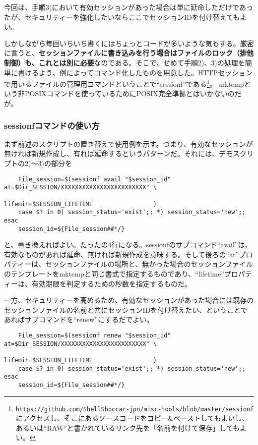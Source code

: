 今回は、手順3)において有効セッションがあった場合は単に延命しただけであったが、セキュリティーを強化したいならここでセッションIDを付け替えてもよい。

しかしながら毎回いちいち書くにはちょっとコードが多いような気もする。厳密に言うと、\textbf{セッションファイルに書き込みを行う場合はファイルのロック（排他制御）も、これとは別に必要}なのである。そこで、せめて手順2)、3)の処理を簡単に書けるよう、例によってコマンド化したものを用意した。HTTPセッションで用いるファイルの管理用コマンドということで``sessionf''である\footnote{\verb|https://github.com/ShellShoccar-jpn/misc-tools/blob/master/sessionf|にアクセスし、そこにあるソースコードをコピー\&{}ペーストしてもよいし、あるいは``RAW''と書かれているリンク先を「名前を付けて保存」してもよい。}。
mktempという非POSIXコマンドを使っているためにPOSIX完全準拠とはいかないのだが。

\subsubsection*{sessionfコマンドの使い方}

まず前述のスクリプトの置き替えで使用例を示す。つまり、有効なセッションが無ければ新規作成し、有れば延命するというパターンだ。それには、デモスクリプトの2)～3)の部分を \\
\begin{frameboxit}{160.0mm}
\begin{verbatim}
	File_session=$(sessionf avail "$session_id" at=$Dir_SESSION/XXXXXXXXXXXXXXXXXXXXXXXX" \
	                                            lifemin=$SESSION_LIFETIME                 )
	case $? in 0) session_status='exist';; *) session_status='new';; esac
	session_id=${File_session##*/}
\end{verbatim}
\end{frameboxit}
と、書き換えればよい。たったの4行になる。sessionfのサブコマンド``avail''は、有効なものがあれば延命、無ければ新規作成を意味する。そして後ろの``at''プロパティーは、セッションファイルの場所と、無かった場合のセッションファイルのテンプレートをmktempと同じ書式で指定するものであり、``lifetime''プロパティーは、有効期限を判定するための秒数を指定するものだ。

一方、セキュリティーを高めるため、有効なセッションがあった場合には既存のセッションファイルの名前と共にセッションIDを付け替えたい、ということであればサブコマンドを``renew''にするだでよい。\\
\begin{frameboxit}{160.0mm}
\begin{verbatim}
	File_session=$(sessionf renew "$session_id" at=$Dir_SESSION/XXXXXXXXXXXXXXXXXXXXXXXX" \
	                                            lifemin=$SESSION_LIFETIME                 )
	case $? in 0) session_status='exist';; *) session_status='new';; esac
	session_id=${File_session##*/}
\end{verbatim}
\end{frameboxit}

